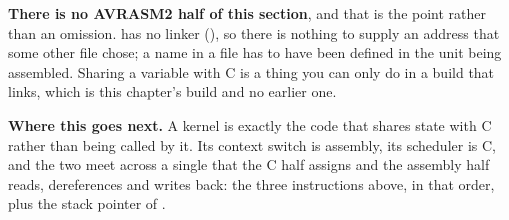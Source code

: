 \textbf{There is no AVRASM2 half of this section}, and that is the point rather than an omission.
 has no linker (), so there is nothing to supply an address that
some other file chose; a name in a  file has to have been defined in the unit being
assembled. Sharing a variable with C is a thing you can only do in a build that links, which is
this chapter's build and no earlier one.

\textbf{Where this goes next.} A kernel is exactly the code that shares state with C rather than
being called by it. Its context switch is assembly, its scheduler is C, and the two meet across a
single  that the C half assigns and the assembly half reads, dereferences and
writes back: the three instructions above, in that order, plus the stack pointer of
.
